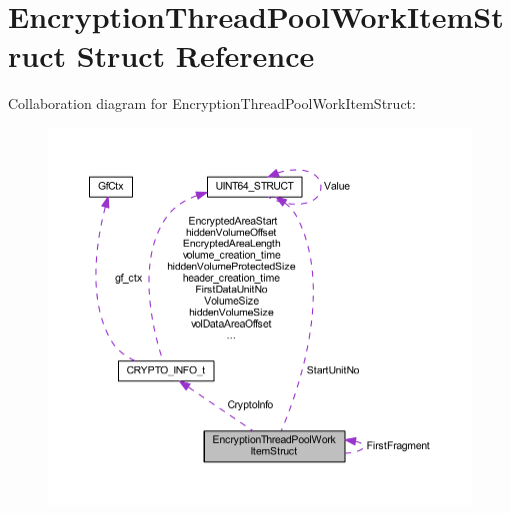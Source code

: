 \hypertarget{struct_encryption_thread_pool_work_item_struct}{}\section{Encryption\+Thread\+Pool\+Work\+Item\+Struct Struct Reference}
\label{struct_encryption_thread_pool_work_item_struct}


Collaboration diagram for Encryption\+Thread\+Pool\+Work\+Item\+Struct\+:
\nopagebreak
\begin{figure}[H]
\begin{center}
\leavevmode
\includegraphics[width=350pt]{struct_encryption_thread_pool_work_item_struct__coll__graph}
\end{center}
\end{figure}
